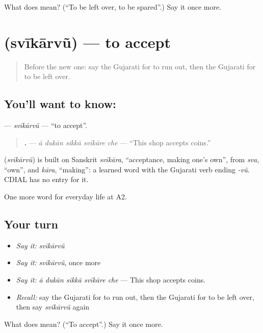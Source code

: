 \begin{tcolorbox}[breakable,colback=teal!4,colframe=teal!35!black,title={Before you move on}]
What does  mean? (\textquotedblleft{}To be left over, to be spared\textquotedblright{}.) Say it once more.
\end{tcolorbox}
\section[\texorpdfstring{\gu{સ્વીકારવું} (svīkārvũ)}{સ્વીકારવું (svīkārvũ)}]{ (svīkārvũ) — to accept}

\label{lesson:GU-C189-svikarvu}



\begin{quote}
Before the new one: say the Gujarati for to run out, then the Gujarati for to be left over.
\end{quote}

\subsection*{You'll want to know: }
\textbf{} — \emph{svīkārvũ} — \textquotedblleft{}to accept\textquotedblright{}.

\begin{quote}
\textbf{    .} — \emph{ā dukān sikkā svīkāre che} — \textquotedblleft{}This shop accepts coins.\textquotedblright{}
\end{quote}

\begin{cousinweb}
\textbf{} (\emph{svīkārvũ}) is built on Sanskrit \emph{svīkāra}, \textquotedblleft{}acceptance, making one's own\textquotedblright{}, from \emph{sva}, \textquotedblleft{}own\textquotedblright{}, and \emph{kāra}, \textquotedblleft{}making\textquotedblright{}: a learned word with the Gujarati verb ending \emph{-vũ}. CDIAL has no entry for it.
\end{cousinweb}

\begin{grammarlens}[title={What you've built}]
One more word for everyday life at A2.
\end{grammarlens}

\subsection*{Your turn}
\begin{itemize}
\raggedright
  \item \emph{Say it:} \emph{svīkārvũ}
  \item \emph{Say it:} \emph{svīkārvũ}, once more
  \item \emph{Say it:} \emph{ā dukān sikkā svīkāre che} — This shop accepts coins.
  \item \emph{Recall:} say the Gujarati for to run out, then the Gujarati for to be left over, then say \emph{svīkārvũ} again
\end{itemize}

\begin{tcolorbox}[breakable,colback=teal!4,colframe=teal!35!black,title={Before you move on}]
What does  mean? (\textquotedblleft{}To accept\textquotedblright{}.) Say it once more.
\end{tcolorbox}

